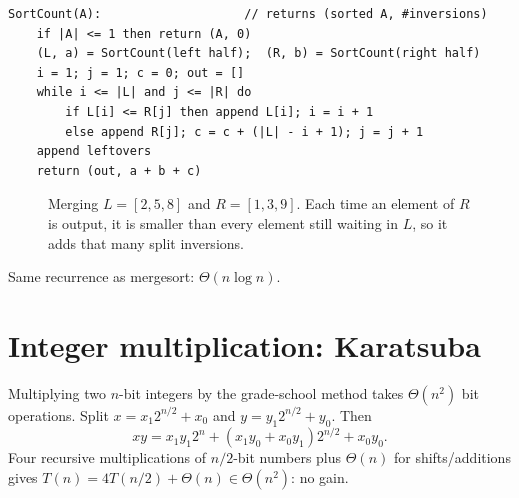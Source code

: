 \begin{lstlisting}[style=pseudo]
SortCount(A):                    // returns (sorted A, #inversions)
    if |A| <= 1 then return (A, 0)
    (L, a) = SortCount(left half);  (R, b) = SortCount(right half)
    i = 1; j = 1; c = 0; out = []
    while i <= |L| and j <= |R| do
        if L[i] <= R[j] then append L[i]; i = i + 1
        else append R[j]; c = c + (|L| - i + 1); j = j + 1
    append leftovers
    return (out, a + b + c)
\end{lstlisting}

\begin{figure}[H]
\centering
{}
\caption{Merging $L=[2,5,8]$ and $R=[1,3,9]$. Each time an element of $R$
is output, it is smaller than every element still waiting in $L$, so it
adds that many split inversions.}
\end{figure}
Same recurrence as mergesort: $\Theta(n\log n)$.

\section{Integer multiplication: Karatsuba}
Multiplying two $n$-bit integers by the grade-school method takes $\Theta(n^2)$ bit operations.
Split $x=x_1 2^{n/2}+x_0$ and $y=y_1 2^{n/2}+y_0$. Then
\[
xy = x_1y_1 2^n + (x_1y_0+x_0y_1)2^{n/2}+x_0y_0.
\]
Four recursive multiplications of $n/2$-bit numbers plus $\Theta(n)$ for shifts/additions gives
$T(n)=4T(n/2)+\Theta(n)\in\Theta(n^2)$: no gain.

